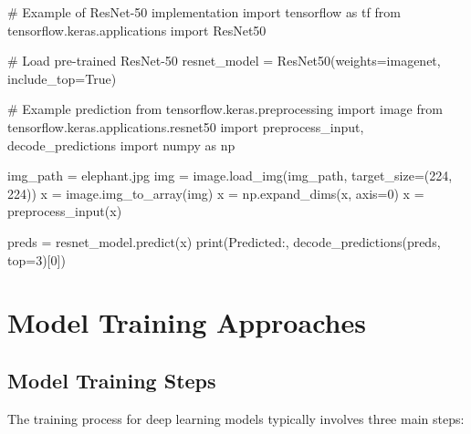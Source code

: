 \documentclass[
  letterpaper,
  DIV=11,
  numbers=noendperiod]{scrreprt}
\newenvironment{Shaded}{\begin{snugshade}}{\end{snugshade}}
\newcommand{\BuiltInTok}[1]{\textcolor[rgb]{0.00,0.23,0.31}{#1}}
\newcommand{\CommentTok}[1]{\textcolor[rgb]{0.37,0.37,0.37}{#1}}
\newcommand{\DecValTok}[1]{\textcolor[rgb]{0.68,0.00,0.00}{#1}}
\newcommand{\ImportTok}[1]{\textcolor[rgb]{0.00,0.46,0.62}{#1}}
\newcommand{\NormalTok}[1]{\textcolor[rgb]{0.00,0.23,0.31}{#1}}
\newcommand{\OperatorTok}[1]{\textcolor[rgb]{0.37,0.37,0.37}{#1}}
\newcommand{\StringTok}[1]{\textcolor[rgb]{0.13,0.47,0.30}{#1}}
\newcommand{\VariableTok}[1]{\textcolor[rgb]{0.07,0.07,0.07}{#1}}
\begin{document}
\begin{Shaded}
\begin{Highlighting}[]
\CommentTok{\# Example of ResNet{-}50 implementation}
\ImportTok{import}\NormalTok{ tensorflow }\ImportTok{as}\NormalTok{ tf}
\ImportTok{from}\NormalTok{ tensorflow.keras.applications }\ImportTok{import}\NormalTok{ ResNet50}

\CommentTok{\# Load pre{-}trained ResNet{-}50}
\NormalTok{resnet\_model }\OperatorTok{=}\NormalTok{ ResNet50(weights}\OperatorTok{=}\StringTok{\textquotesingle{}imagenet\textquotesingle{}}\NormalTok{, include\_top}\OperatorTok{=}\VariableTok{True}\NormalTok{)}

\CommentTok{\# Example prediction}
\ImportTok{from}\NormalTok{ tensorflow.keras.preprocessing }\ImportTok{import}\NormalTok{ image}
\ImportTok{from}\NormalTok{ tensorflow.keras.applications.resnet50 }\ImportTok{import}\NormalTok{ preprocess\_input, decode\_predictions}
\ImportTok{import}\NormalTok{ numpy }\ImportTok{as}\NormalTok{ np}

\NormalTok{img\_path }\OperatorTok{=} \StringTok{\textquotesingle{}elephant.jpg\textquotesingle{}}
\NormalTok{img }\OperatorTok{=}\NormalTok{ image.load\_img(img\_path, target\_size}\OperatorTok{=}\NormalTok{(}\DecValTok{224}\NormalTok{, }\DecValTok{224}\NormalTok{))}
\NormalTok{x }\OperatorTok{=}\NormalTok{ image.img\_to\_array(img)}
\NormalTok{x }\OperatorTok{=}\NormalTok{ np.expand\_dims(x, axis}\OperatorTok{=}\DecValTok{0}\NormalTok{)}
\NormalTok{x }\OperatorTok{=}\NormalTok{ preprocess\_input(x)}

\NormalTok{preds }\OperatorTok{=}\NormalTok{ resnet\_model.predict(x)}
\BuiltInTok{print}\NormalTok{(}\StringTok{\textquotesingle{}Predicted:\textquotesingle{}}\NormalTok{, decode\_predictions(preds, top}\OperatorTok{=}\DecValTok{3}\NormalTok{)[}\DecValTok{0}\NormalTok{])}
\end{Highlighting}
\end{Shaded}

\section{Model Training Approaches}\label{model-training-approaches}

\subsection{Model Training Steps}\label{model-training-steps}

The training process for deep learning models typically involves three
main steps:
\end{document}
